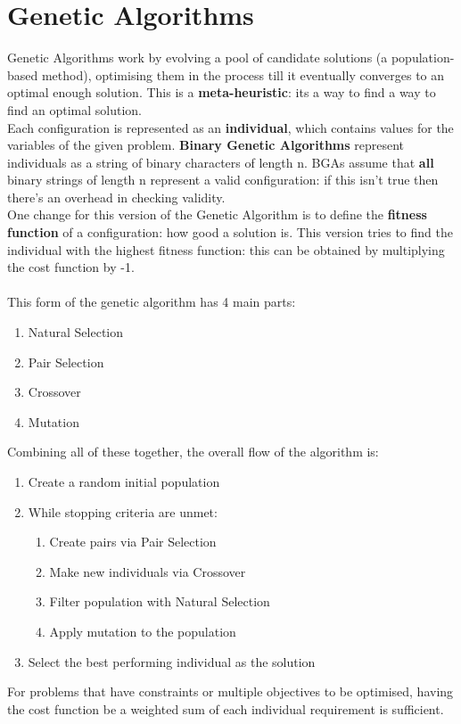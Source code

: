 \section{Genetic Algorithms}
Genetic Algorithms work by evolving a pool of candidate solutions (a population-based method), optimising them in the process till it eventually converges to an optimal enough solution. This is a \textbf{meta-heuristic}: its a way to find a way to find an optimal solution. \\
Each configuration is represented as an \textbf{individual}, which contains values for the variables of the given problem. \textbf{Binary Genetic Algorithms} represent individuals as a string of binary characters of length n. BGAs assume that \textbf{all} binary strings of length n represent a valid configuration: if this isn't true then there's an overhead in checking validity.\\
One change for this version of the Genetic Algorithm is to define the \textbf{fitness function} of a configuration: how good a solution is. This version tries to find the individual with the highest fitness function: this can be obtained by multiplying the cost function by -1.
\\ \\
This form of the genetic algorithm has 4 main parts:
\begin{enumerate}
    \item Natural Selection
    \item Pair Selection
    \item Crossover
    \item Mutation\\ 
\end{enumerate}
Combining all of these together, the overall flow of the algorithm is: 
\begin{enumerate}[label=\Alph*]
\item Create a random initial population
\item While stopping criteria are unmet:
\begin{enumerate}[label=\arabic*]
    \item Create pairs via Pair Selection
    \item Make new individuals via Crossover
    \item Filter population with Natural Selection
    \item Apply mutation to the population
\end{enumerate}
\item Select the best performing individual as the solution\\
\end{enumerate}
For problems that have constraints or multiple objectives to be optimised, having the cost function be a weighted sum of each individual requirement is sufficient. 


